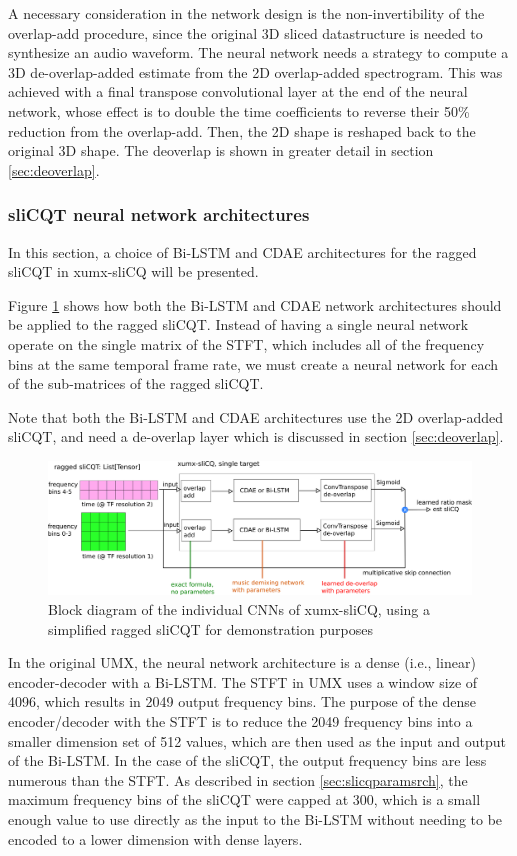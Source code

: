 \documentclass[report.tex]{subfiles}
\begin{document}
A necessary consideration in the network design is the non-invertibility of the overlap-add procedure, since the original 3D sliced datastructure is needed to synthesize an audio waveform. The neural network needs a strategy to compute a 3D de-overlap-added estimate from the 2D overlap-added spectrogram. This was achieved with a final transpose convolutional layer at the end of the neural network, whose effect is to double the time coefficients to reverse their 50\% reduction from the overlap-add. Then, the 2D shape is reshaped back to the original 3D shape. The deoverlap is shown in greater detail in section \ref{sec:deoverlap}.

\subsubsection{sliCQT neural network architectures}
\label{sec:slicqarches}

In this section, a choice of Bi-LSTM and CDAE architectures for the ragged sliCQT in xumx-sliCQ will be presented.

Figure \ref{fig:cdaeslicqt} shows how both the Bi-LSTM and CDAE network architectures should be applied to the ragged sliCQT. Instead of having a single neural network operate on the single matrix of the STFT, which includes all of the frequency bins at the same temporal frame rate, we must create a neural network for each of the sub-matrices of the ragged sliCQT.

Note that both the Bi-LSTM and CDAE architectures use the 2D overlap-added sliCQT, and need a de-overlap layer which is discussed in section \ref{sec:deoverlap}.

\begin{figure}[ht]
	\centering
	\includegraphics[width=\textwidth]{./images-blockdiagrams/xumx_slicq_pertarget_cdae_bilstm.png}
	\caption{Block diagram of the individual CNNs of xumx-sliCQ, using a simplified ragged sliCQT for demonstration purposes}
	\label{fig:cdaeslicqt}
\end{figure}

In the original UMX, the neural network architecture is a dense (i.e., linear) encoder-decoder with a Bi-LSTM. The STFT in UMX uses a window size of 4096, which results in 2049 output frequency bins. The purpose of the dense encoder/decoder with the STFT is to reduce the 2049 frequency bins into a smaller dimension set of 512 values, which are then used as the input and output of the Bi-LSTM. In the case of the sliCQT, the output frequency bins are less numerous than the STFT. As described in section \ref{sec:slicqparamsrch}, the maximum frequency bins of the sliCQT were capped at 300, which is a small enough value to use directly as the input to the Bi-LSTM without needing to be encoded to a lower dimension with dense layers.
\end{document}
